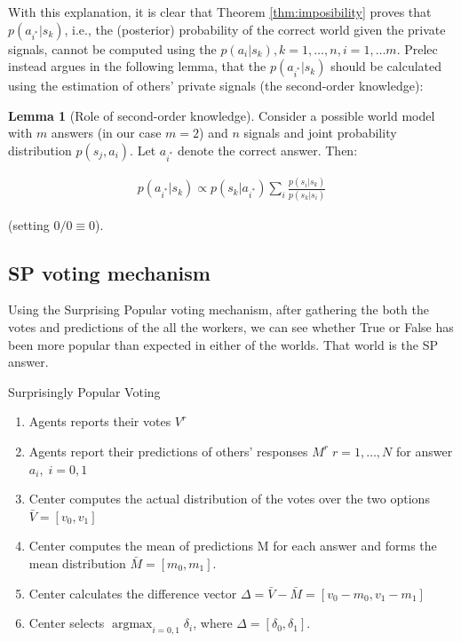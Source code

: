\documentclass{report}
\theoremstyle{definition}
\newtheorem{lemma}[]{Lemma}
\begin{document}
With this explanation, it is clear that Theorem \ref{thm:imposibility} proves that $p({a_{i^*}} |{ s_k})$, i.e., the (posterior) probability of the correct world given the private signals, cannot be computed using the $p(a_i|s_k), k = 1,\dots, n, i = 1,\dots m$. Prelec instead argues in the following lemma, that the  $p(a_{i^*} | {s_k})$ should be calculated using the estimation of others' private signals (the second-order knowledge):

\begin{lemma}[Role of second-order knowledge]
\label{lemma:2nd_order}
Consider a possible world model with $m$ answers (in our case $m = 2$) and $n$ signals and joint probability distribution $p(s_j, a_i)$. Let $a_{i^*}$ denote the correct answer. Then:

\begin{align}
 p({a_{i^*}} | {s_k}) \propto p({s_k} |{a_{i^*}}) \sum_i\frac{p(s_i|s_k)}{p(s_k|s_i)}
\end{align}


(setting $0/0 \equiv 0$).
\end{lemma}


\subsection{SP voting mechanism}
 Using the Surprising Popular voting mechanism, after gathering the both the votes and predictions of the all the workers, we can see whether True or False has been more popular than expected in either of the worlds. That world is the SP answer. 
 
 \begin{algorithm}[tbh]
    \caption{Surprisingly Popular Voting}
    \label{alg:SP}
    \begin{enumerate}
        \item Agents reports their votes $V^r$
        \item Agents report their predictions of others' responses $M^r\; r=1,\dots, N$ for answer $a_i,\; i=0,1$
        \item Center computes the actual distribution of the votes over the two options $\bar{V}=[v_0, v_1]$
        \item Center computes the mean of predictions M for each answer and forms the mean distribution $\bar{M} = [m_0, m_1]$.
        \item Center calculates the difference vector $\Delta = \bar{V} - \bar{M} = [v_0 - m_0, v_1 - m_1]$
        \item{Center selects $\operatorname{argmax}_{i= 0,1}\delta_i$, where $\Delta = [\delta_0, \delta_1]$}.
    \end{enumerate}
\end{algorithm}
\end{document}
